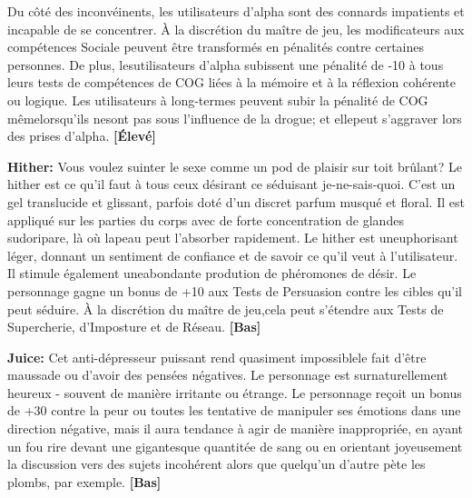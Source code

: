 Du côté des inconvéinents, les utilisateurs d'alpha sont des connards impatients et incapable de se concentrer. À la discrétion du maître de jeu, les modificateurs aux compétences Sociale peuvent être transformés en pénalités contre certaines personnes. De plus, lesutilisateurs d'alpha subissent une pénalité de -10 à tous leurs tests de compétences de COG liées à la mémoire et à la réflexion cohérente ou logique. Les utilisateurs à long-termes peuvent subir la pénalité de COG mêmelorsqu'ils nesont pas sous l'influence de la drogue; et ellepeut s'aggraver lors des prises d'alpha. \textbf{[Élevé]} 

\textbf{Hither:} Vous voulez suinter le sexe comme un pod de plaisir sur toit brûlant? Le hither est ce qu'il faut à tous ceux désirant ce séduisant je-ne-sais-quoi. C'est un gel translucide et glissant, parfois doté d'un discret parfum musqué et floral. Il est appliqué sur les parties du corps avec de forte concentration de glandes sudoripare, là où lapeau peut l'absorber rapidement. Le hither est uneuphorisant léger, donnant un sentiment de confiance et de savoir ce qu'il veut à l'utilisateur. Il stimule également uneabondante prodution de phéromones de désir. Le personnage gagne un bonus de +10 aux Tests de Persuasion contre les cibles qu'il peut séduire. À la discrétion du maître de jeu,cela peut s'étendre aux Tests de Supercherie, d'Imposture et de Réseau. \textbf{[Bas]} 

\textbf{Juice:} Cet anti-dépresseur puissant rend quasiment impossiblele fait d'être maussade ou d'avoir des pensées négatives. Le personnage est surnaturellement heureux - souvent de manière irritante ou étrange. Le personnage reçoit un bonus de +30 contre la peur ou toutes les tentative de manipuler ses émotions dans une direction négative, mais il aura tendance à agir de manière inappropriée, en ayant un fou rire devant une gigantesque quantitée de sang ou en orientant joyeusement  la discussion vers des sujets incohérent alors que quelqu'un d'autre pète les plombs, par exemple. \textbf{[Bas]} 



